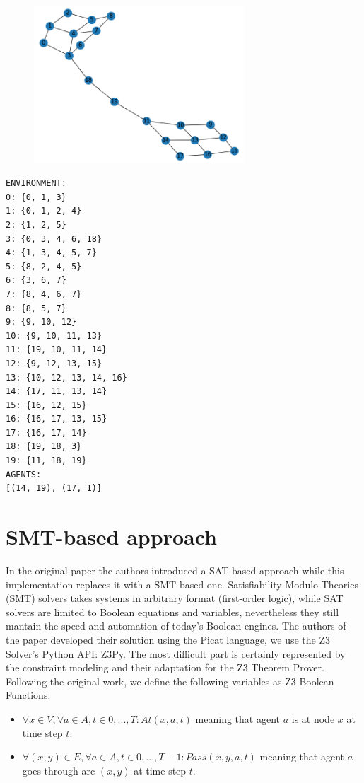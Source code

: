 \documentclass[12pt, a4paper, hidelinks]{article}
\numberwithin{equation}{section}
\begin{document}
\begin{figure}
    \centering
    \includegraphics[width=0.7\textwidth]{environment.png}
\end{figure}

\begin{lstlisting}[label={lst:environment}]
ENVIRONMENT:
0: {0, 1, 3}
1: {0, 1, 2, 4}
2: {1, 2, 5}
3: {0, 3, 4, 6, 18}
4: {1, 3, 4, 5, 7}
5: {8, 2, 4, 5}
6: {3, 6, 7}
7: {8, 4, 6, 7}
8: {8, 5, 7}
9: {9, 10, 12}
10: {9, 10, 11, 13}
11: {19, 10, 11, 14}
12: {9, 12, 13, 15}
13: {10, 12, 13, 14, 16}
14: {17, 11, 13, 14}
15: {16, 12, 15}
16: {16, 17, 13, 15}
17: {16, 17, 14}
18: {19, 18, 3}
19: {11, 18, 19}
AGENTS:
[(14, 19), (17, 1)]
\end{lstlisting}


\section{SMT-based approach}\label{sec:smt-based-approach}
In the original paper the authors introduced a SAT-based approach while this implementation replaces it with a SMT-based one. 
Satisfiability Modulo Theories (SMT) solvers takes systems in arbitrary format (first-order logic), while SAT solvers are limited to Boolean equations and variables, nevertheless they still mantain the speed and automation of today's Boolean engines.
The authors of the paper developed their solution using the Picat language, we use the Z3 Solver's Python API: Z3Py.
The most difficult part is certainly represented by the constraint modeling and their adaptation for the Z3 Theorem Prover.
Following the original work, we define the following variables as Z3 Boolean Functions:

\begin{itemize}
\item $\forall x \in V, \forall a \in A, t \in {0, ..., T} : At(x, a, t)$ meaning that agent $a$ is at node $x$ at time step $t$.
\item $\forall(x, y)\in E, \forall a \in A, t \in {0, ..., T-1} : Pass(x, y, a, t)$ meaning that agent $a$ goes through arc $(x, y)$ at time step $t$. 
\end{itemize}
\end{document}
